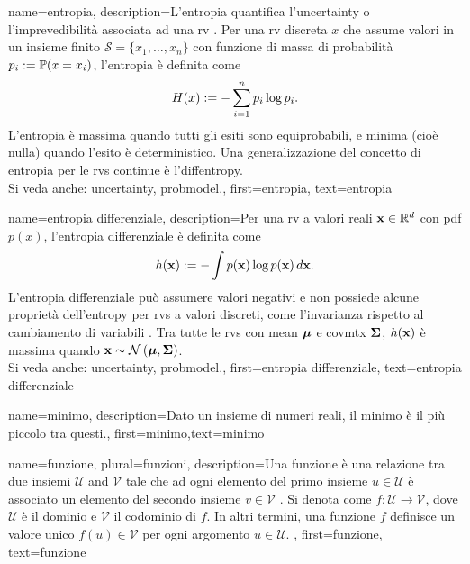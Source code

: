 {name={entropia},
	description={L'entropia quantifica l'\gls{uncertainty} o l’imprevedibilità associata ad una \gls{rv} \cite{coverthomas}. 
		Per una \gls{rv} discreta $x$ che assume valori in un insieme finito $\mathcal{S} = \{x_1, \ldots, x_n\}$ con 
		funzione di massa di probabilità $p_i := \mathbb{P}({x = x_i})$, l'entropia è definita come
		\[
		H(x) := -\sum_{i=1}^n p_i \log p_i.
		\]
		L'entropia è massima quando tutti gli esiti sono equiprobabili, e minima (cioè nulla) quando l'esito è deterministico. 
		Una generalizzazione del concetto di entropia per le \glspl{rv} continue è l'\gls{diffentropy}. 
\\
		Si veda anche: \gls{uncertainty}, \gls{probmodel}.},
	first={entropia},
	text={entropia}
}

{name={entropia differenziale},
	description={Per una \gls{rv} a valori reali ${\bf x} \in \mathbb{R}^{d}$ 
		con \gls{pdf} $p(x)$,
		l'entropia differenziale è definita come \cite{coverthomas}
		\[
		h({\bf x}) := - \int p({\bf x}) \log p({\bf x}) \, d{\bf x}.
		\]
		L'entropia differenziale può assumere valori negativi e non possiede alcune proprietà dell'\gls{entropy} per 
		\glspl{rv} a valori discreti, come l'invarianza rispetto al cambiamento di variabili \cite{coverthomas}. 
		Tra tutte le \glspl{rv} con \gls{mean} ${\bm \mu}$ e \gls{covmtx} ${\bf \Sigma}$, 
		$h({\bf x})$ è massima quando ${\bf x} \sim \mathcal{N}\left({\bm \mu},{\bf \Sigma}\right)$. 
		\\
		Si veda anche: \gls{uncertainty}, \gls{probmodel}.},
	first={entropia differenziale},
	text={entropia differenziale}
}


{
	name=minimo,
	description={Dato un insieme di numeri reali, il minimo è il più piccolo tra questi.},
	first={minimo},text={minimo}
}

{name={funzione}, plural={funzioni}, 
	description={Una funzione è una relazione   tra due insiemi $\mathcal{U}$ and $\mathcal{V}$ tale che ad ogni   
	elemento del primo insieme $u \in \mathcal{U}$ è associato un elemento del secondo insieme $v \in \mathcal{V}$ 
	\cite{RudinBookPrinciplesMatheAnalysis}. 
		  Si denota come $f: \mathcal{U} \rightarrow \mathcal{V}$, dove $\mathcal{U}$ è il dominio 
		  e $\mathcal{V}$ il codominio di $f$. In altri termini, una funzione $f$ definisce un valore unico 
		   $f(u) \in \mathcal{V}$ per ogni argomento $u \in \mathcal{U}$. 
	},
	first={funzione},
	text={funzione}
}


